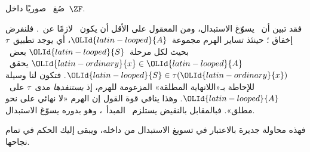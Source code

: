 \documentclass[../../../include/open-logic-section]{subfiles}
\begin{document}
\begin{prob}
	صُغ~\stagescofin{} صوريًا داخل~$\ZF$.
\end{prob}

فقد تبين أن~\stagescofin{} يسوّغ الاستبدال، ومن المعقول على الأقل أن
يكون~\stagescofin{} لازمًا عن~\stagesinex. فلنفرض إخفاق
\stagescofin؛ حينئذ تساير الهرم مجموعة~$\OLId{latin-looped}{A}$، أي يوجد تطبيق~$\tau$
بحيث لكل مرحلة~$\OLId{latin-looped}{S}$ بعض~$\OLId{latin-ordinary}{x} \in \OLId{latin-looped}{A}$ يحقق~$\OLId{latin-looped}{S} \in \tau(\OLId{latin-ordinary}{x})$. فتكون لنا
وسيلة للإحاطة بـ«اللانهاية المطلقة» المزعومة للهرم، إذ \emph{يستنفدها}
مدى~$\tau$ على~$\OLId{latin-looped}{A}$. وهذا ينافي قوة القول إن الهرم «لا نهائي على نحو
مطلق». فبالمقابل بالنقيض يستلزم~\stagesinex{} المبدأ~\stagescofin،
وهو بدوره يسوّغ الاستبدال.

فهذه محاولة جديرة بالاعتبار في تسويغ الاستبدال من داخله، ويبقى إليك
الحكم في تمام نجاحها.
\end{document}
